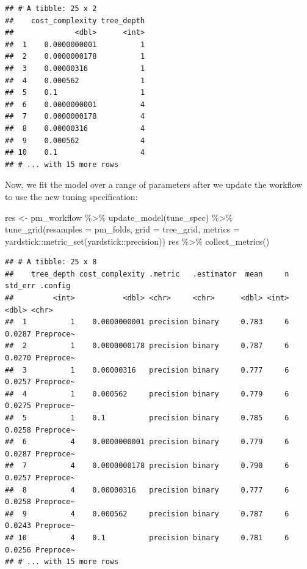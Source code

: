 \documentclass[
]{article}
\newenvironment{Shaded}{\begin{snugshade}}{\end{snugshade}}
\newcommand{\AttributeTok}[1]{\textcolor[rgb]{0.77,0.63,0.00}{#1}}
\newcommand{\FunctionTok}[1]{\textcolor[rgb]{0.00,0.00,0.00}{#1}}
\newcommand{\NormalTok}[1]{#1}
\newcommand{\OtherTok}[1]{\textcolor[rgb]{0.56,0.35,0.01}{#1}}
\newcommand{\SpecialCharTok}[1]{\textcolor[rgb]{0.00,0.00,0.00}{#1}}
\begin{document}
\begin{verbatim}
## # A tibble: 25 x 2
##    cost_complexity tree_depth
##              <dbl>      <int>
##  1    0.0000000001          1
##  2    0.0000000178          1
##  3    0.00000316            1
##  4    0.000562              1
##  5    0.1                   1
##  6    0.0000000001          4
##  7    0.0000000178          4
##  8    0.00000316            4
##  9    0.000562              4
## 10    0.1                   4
## # ... with 15 more rows
\end{verbatim}

Now, we fit the model over a range of parameters after we update the
workflow to use the new tuning specification:

\begin{Shaded}
\begin{Highlighting}[]
\NormalTok{res }\OtherTok{\textless{}{-}}\NormalTok{ pm\_workflow }\SpecialCharTok{\%\textgreater{}\%} 
  \FunctionTok{update\_model}\NormalTok{(tune\_spec) }\SpecialCharTok{\%\textgreater{}\%}
  \FunctionTok{tune\_grid}\NormalTok{(}\AttributeTok{resamples =}\NormalTok{ pm\_folds,}
                  \AttributeTok{grid =}\NormalTok{ tree\_grid,}
                  \AttributeTok{metrics =}\NormalTok{ yardstick}\SpecialCharTok{::}\FunctionTok{metric\_set}\NormalTok{(yardstick}\SpecialCharTok{::}\NormalTok{precision))}
\NormalTok{res }\SpecialCharTok{\%\textgreater{}\%} \FunctionTok{collect\_metrics}\NormalTok{()}
\end{Highlighting}
\end{Shaded}

\begin{verbatim}
## # A tibble: 25 x 8
##    tree_depth cost_complexity .metric   .estimator  mean     n std_err .config  
##         <int>           <dbl> <chr>     <chr>      <dbl> <int>   <dbl> <chr>    
##  1          1    0.0000000001 precision binary     0.783     6  0.0287 Preproce~
##  2          1    0.0000000178 precision binary     0.787     6  0.0270 Preproce~
##  3          1    0.00000316   precision binary     0.777     6  0.0257 Preproce~
##  4          1    0.000562     precision binary     0.779     6  0.0275 Preproce~
##  5          1    0.1          precision binary     0.785     6  0.0258 Preproce~
##  6          4    0.0000000001 precision binary     0.779     6  0.0287 Preproce~
##  7          4    0.0000000178 precision binary     0.790     6  0.0257 Preproce~
##  8          4    0.00000316   precision binary     0.777     6  0.0258 Preproce~
##  9          4    0.000562     precision binary     0.787     6  0.0243 Preproce~
## 10          4    0.1          precision binary     0.781     6  0.0256 Preproce~
## # ... with 15 more rows
\end{verbatim}
\end{document}

